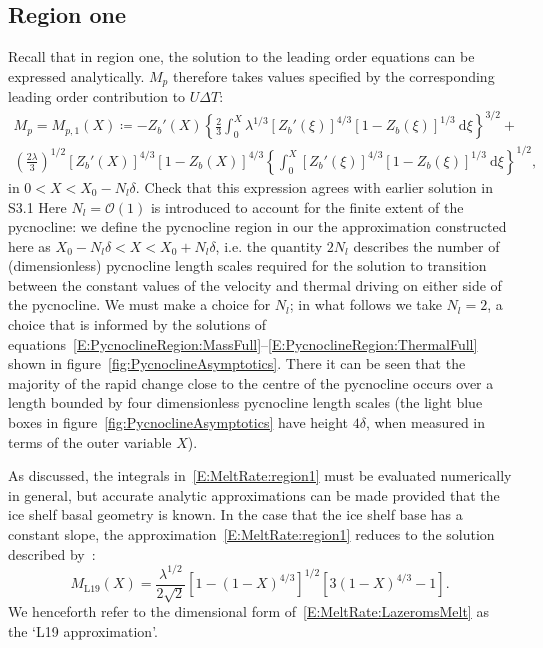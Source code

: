 \documentclass[openacc]{rsproca_new}%
\newcommand{\order}[1]{\mathcal{O}(#1)}
\newcommand{\red}[1]{{\color{red} #1}}
\newcommand{\lt}{\delta} %
\begin{document}
\subsection{Region one}
Recall that in region one, the solution to the leading order equations can be expressed analytically. $M_p$ therefore takes values specified by the corresponding leading order contribution to $U\Delta T$:
\begin{multline}\label{E:MeltRate:region1}
M_{p} = M_{p,1}(X) \coloneqq - Z_b'(X)\left\{\frac{2}{3}\int_0^X \lambda^{1/3}\left[Z_b'(\xi)\right]^{4/3}\left[1 - Z_b(\xi)\right]^{1/3}~\mathrm{d}\xi\right\}^{3/2} + \\
\left(\frac{2\lambda}{3}\right)^{1/2}\left[Z_b'(X)\right]^{4/3}\left[1 - Z_b(X)\right]^{4/3} \left\{\int_0^X \left[Z_b'(\xi)\right]^{4/3}\left[1 - Z_b(\xi)\right]^{1/3}~\mathrm{d}\xi\right\}^{1/2},
\end{multline}
in $0 < X < X_0 - N_l \lt $. \red{Check that this expression agrees with earlier solution in S3.1} Here $N_l = \order{1}$ is introduced to account for the finite extent of the pycnocline: we define the pycnocline region in our the approximation constructed here as $X_0 - N_l \lt < X < X_0 + N_l \lt$, i.e. the quantity $2 N_l$ describes the number of (dimensionless) pycnocline length scales required for the solution to transition between the constant values of the velocity and thermal driving on either side of the pycnocline.  We must make a choice for $N_l$; in what follows we take $N_l = 2$, a choice that is informed by the solutions of equations~\eqref{E:PycnoclineRegion:MassFull}--\eqref{E:PycnoclineRegion:ThermalFull} shown in figure~\ref{fig:PycnoclineAsymptotics}. There it can be seen that the majority of the rapid change close to the centre of the pycnocline occurs over a length bounded by four dimensionless pycnocline length scales (the light blue boxes in figure~\ref{fig:PycnoclineAsymptotics} have height $4\lt$, when measured in terms of the outer variable $X$).

As discussed, the integrals in~\eqref{E:MeltRate:region1} must be evaluated numerically in general, but accurate analytic approximations can be made provided that the ice shelf basal geometry is known. In the case that the ice shelf base has a constant slope, the approximation~\eqref{E:MeltRate:region1} reduces to the solution described by~\cite{Lazeroms2019JPhysOcean}:
\begin{equation}\label{E:MeltRate:LazeromsMelt}
M_{\text{L19}}(X) = \frac{\lambda^{1/2}}{2\sqrt{2}}\left[1 - (1 - X)^{4/3}\right]^{1/2}\left[3(1-X)^{4/3} - 1\right].
\end{equation}
We henceforth refer to the dimensional form of~\eqref{E:MeltRate:LazeromsMelt} as the `L19 approximation'. 
\end{document}
